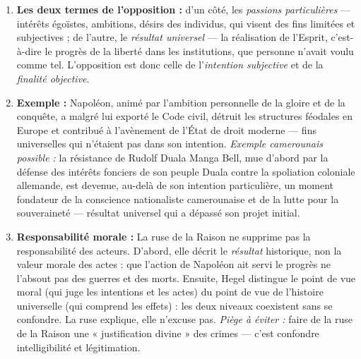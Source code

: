 \documentclass[11pt]{article}
\begin{document}
\begin{corrige}
\begin{enumerate}
\item \textbf{Les deux termes de l'opposition :} d'un côté, les \emph{passions particulières} — intérêts égoïstes, ambitions, désirs des individus, qui visent des fins limitées et subjectives ; de l'autre, le \emph{résultat universel} — la réalisation de l'Esprit, c'est-à-dire le progrès de la liberté dans les institutions, que personne n'avait voulu comme tel. L'opposition est donc celle de l'\emph{intention subjective} et de la \emph{finalité objective}.
\item \textbf{Exemple :} Napoléon, animé par l'ambition personnelle de la gloire et de la conquête, a malgré lui exporté le Code civil, détruit les structures féodales en Europe et contribué à l'avènement de l'État de droit moderne — fins universelles qui n'étaient pas dans son intention. \emph{Exemple camerounais possible :} la résistance de Rudolf Duala Manga Bell, mue d'abord par la défense des intérêts fonciers de son peuple Duala contre la spoliation coloniale allemande, est devenue, au-delà de son intention particulière, un moment fondateur de la conscience nationaliste camerounaise et de la lutte pour la souveraineté — résultat universel qui a dépassé son projet initial.
\item \textbf{Responsabilité morale :} La ruse de la Raison ne supprime pas la responsabilité des acteurs. D'abord, elle décrit le \emph{résultat} historique, non la valeur morale des actes : que l'action de Napoléon ait servi le progrès ne l'absout pas des guerres et des morts. Ensuite, Hegel distingue le point de vue moral (qui juge les intentions et les actes) du point de vue de l'histoire universelle (qui comprend les effets) : les deux niveaux coexistent sans se confondre. La ruse explique, elle n'excuse pas. \emph{Piège à éviter :} faire de la ruse de la Raison une « justification divine » des crimes — c'est confondre intelligibilité et légitimation.
\end{enumerate}
\end{corrige}
\end{document}
